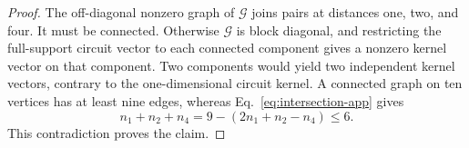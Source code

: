 \documentclass[10pt,a4paper]{amsart}
\begin{document}
\begin{proof}
The off-diagonal nonzero graph of \(\mathcal G\) joins pairs at distances one,
two, and four.  It must be connected.  Otherwise \(\mathcal G\) is block
diagonal, and
restricting the full-support circuit vector to each connected component gives
a nonzero kernel vector on that component.  Two components would yield two
independent kernel vectors, contrary to the one-dimensional circuit kernel.
A connected graph on ten vertices has at least nine edges, whereas
Eq.~\eqref{eq:intersection-app} gives
\[
  n_1+n_2+n_4
  =
  9-(2n_1+n_2-n_4)
  \leq6.
\]
This contradiction proves the claim.
\end{proof}
\end{document}
